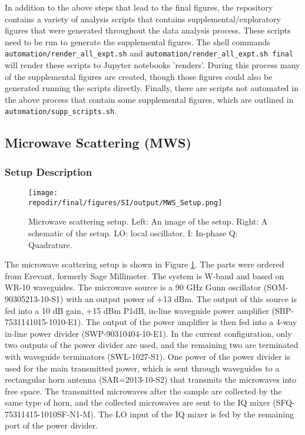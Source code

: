 In addition to the above steps that lead to the final figures, the repository contains a variety of analysis scripts that contains supplemental/exploratory figures that were generated throughout the data analysis process. These scripts need to be run to generate the supplemental figures. The shell commands \texttt{automation/render\_all\_expt.sh} and \texttt{automation/render\_all\_expt.sh final} will render these scripts to Jupyter notebooks 'renders'. During this process many of the supplemental figures are created, though those figures could also be generated running the scripts directly. Finally, there are scripts not automated in the above process that contain some supplemental figures, which are outlined in \texttt{automation/supp\_scripts.sh}. 

\clearpage
\subsection{Microwave Scattering (MWS) }


\subsubsection{Setup Description}
\begin{figure}[]
\centering
\texttt{[image: \\repodir/final/figures/SI/output/MWS\_Setup.png]}
\caption{Microwave scattering setup. Left: An image of the setup. Right: A schematic of the setup. LO: local oscillator. I: In-phase Q: Quadrature.  }
\label{fig:SI_MWS_Setup}
\end{figure}

The microwave scattering setup is shown in Figure \ref{fig:SI_MWS_Setup}. The parts were ordered from Erevant, formerly Sage Millimeter. The system is W-band and based on WR-10 waveguides. The microwave source is a 90 GHz Gunn oscillator (SOM-90305213-10-S1) with an output power of +13 dBm. The output of this source is fed into a 10 dB gain, +15 dBm P1dB, in-line waveguide power amplifier (SBP-7531141015-1010-E1). The output of the power amplifier is then fed into a 4-way in-line power divider (SWP-90310404-10-E1). In the current configuration, only two outputs of the power divider are used, and the remaining two are terminated with waveguide terminators (SWL-1027-S1). One power of the power divider is used for the main transmitted power, which is sent through waveguides to a rectangular horn antenna (SAR=2013-10-S2) that transmits the microwaves into free space. The transmitted microwaves after the sample are collected by the same type of horn, and the collected microwaves are sent to the IQ mixer (SFQ-75311415-1010SF-N1-M). The LO input of the IQ mixer is fed by the remaining port of the power divider. 

